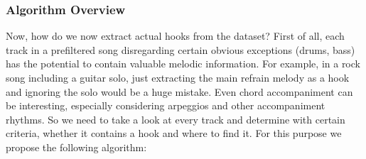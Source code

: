 \documentclass[a4paper,12pt]{extarticle}
\begin{document}
\subsubsection{Algorithm Overview}
Now, how do we now extract actual hooks from the dataset? First of all, each track in a prefiltered song disregarding certain obvious exceptions (drums, bass) has the potential to contain valuable melodic information. For example, in a rock song including a guitar solo, just extracting the main refrain melody as a hook and ignoring the solo would be a huge mistake. Even chord accompaniment can be interesting, especially considering arpeggios and other accompaniment rhythms. So we need to take a look at every track and determine with certain criteria, whether it contains a hook and where to find it. For this purpose we propose the following algorithm:
\end{document}
